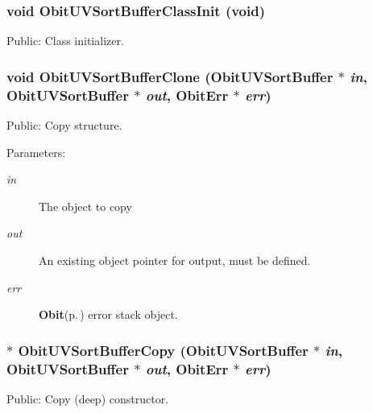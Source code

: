 \subsubsection{\setlength{\rightskip}{0pt plus 5cm}void Obit\-UVSort\-Buffer\-Class\-Init (void)}\label{ObitUVSortBuffer_8h_a7}


Public: Class initializer. 

\subsubsection{\setlength{\rightskip}{0pt plus 5cm}void Obit\-UVSort\-Buffer\-Clone ({\bf Obit\-UVSort\-Buffer} $\ast$ {\em in}, {\bf Obit\-UVSort\-Buffer} $\ast$ {\em out}, {\bf Obit\-Err} $\ast$ {\em err})}\label{ObitUVSortBuffer_8h_a12}


Public: Copy structure. 

\begin{Desc}
\item[Parameters:]
\begin{description}
\item[{\em in}]The object to copy \item[{\em out}]An existing object pointer for output, must be defined. \item[{\em err}]{\bf Obit}{\rm (p.\,\pageref{structObit})} error stack object. \end{description}
\end{Desc}
\subsubsection{$\ast$ Obit\-UVSort\-Buffer\-Copy ({\bf Obit\-UVSort\-Buffer} $\ast$ {\em in}, {\bf Obit\-UVSort\-Buffer} $\ast$ {\em out}, {\bf Obit\-Err} $\ast$ {\em err})}\label{ObitUVSortBuffer_8h_a11}


Public: Copy (deep) constructor. 

